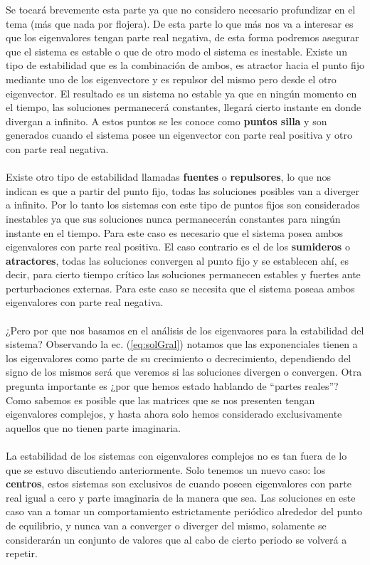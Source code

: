 \documentclass[11pt,a4paper]{article}
\begin{document}
Se tocará brevemente esta parte ya que no considero necesario profundizar en el tema (más que nada por flojera). De esta parte lo que más nos va a interesar es que los eigenvalores tengan parte real negativa, de esta forma podremos asegurar que el sistema es estable o que de otro modo el sistema es inestable. Existe un tipo de estabilidad que es la combinación de ambos, es atractor hacia el punto fijo mediante uno de los eigenvectore y es repulsor del mismo pero desde el otro eigenvector. El resultado es un sistema no estable ya que en ningún momento en el tiempo, las soluciones permanecerá constantes, llegará cierto instante en donde divergan a infinito. A estos puntos se les conoce como \textbf{puntos silla} y son generados cuando el sistema posee un eigenvector con parte real positiva y otro con parte real negativa.\\
\\
Existe otro tipo de estabilidad llamadas \textbf{fuentes} o \textbf{repulsores}, lo que nos indican es que a partir del punto fijo, todas las soluciones posibles van a diverger a infinito. Por lo tanto los sistemas con este tipo de puntos fijos son considerados inestables ya que sus soluciones nunca permanecerán constantes para ningún instante en el tiempo. Para este caso es necesario que el sistema posea ambos eigenvalores con parte real positiva. El caso contrario es el de los \textbf{sumideros} o \textbf{atractores}, todas las soluciones convergen al punto fijo y se establecen ahí, es decir, para cierto tiempo crítico las soluciones permanecen estables y fuertes ante perturbaciones externas. Para este caso se necesita que el sistema poseaa ambos eigenvalores con parte real negativa.\\
\\
¿Pero por que nos basamos en el análisis de los eigenvaores para la estabilidad del sistema? Observando la ec. (\ref{eq:solGral}) notamos que las exponenciales tienen a los eigenvalores como parte de su crecimiento o decrecimiento, dependiendo del signo de los mismos será que veremos si las soluciones divergen o convergen. Otra pregunta importante es ¿por que hemos estado hablando de ``partes reales''? Como sabemos es posible que las matrices que se nos presenten tengan eigenvalores complejos, y hasta ahora solo hemos considerado exclusivamente aquellos que no tienen parte imaginaria.\\
\\
La estabilidad de los sistemas con eigenvalores complejos no es tan fuera de lo que se estuvo discutiendo anteriormente. Solo tenemos un nuevo caso: los \textbf{centros}, estos sistemas son exclusivos de cuando poseen eigenvalores con parte real igual a cero y parte imaginaria de la manera que sea. Las soluciones en este caso van a tomar un comportamiento estrictamente periódico alrededor del punto de equilibrio, y nunca van a converger o diverger del mismo, solamente  se considerarán un conjunto de valores que al cabo de cierto periodo se volverá a repetir.\\
\end{document}
